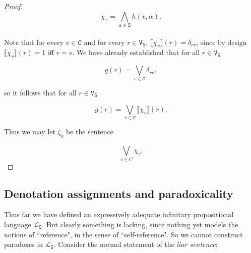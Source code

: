 \documentclass[12pt]{article}
\newtheorem{defn}{Definition}
\theoremstyle{remark}
\newcommand{\fancy}[1]{\mathcal{#1}}
\def\S{\textsf{S}}
\def\V{\texttt{V}}
\def\C{\texttt{C}}
\def\L{\fancy{L}}
\begin{document}
\begin{proof}
\[\chi_v = \bigwedge_{\alpha \in \S} h(v, \alpha).\]\\


Note that for every $v \in \C$ and for every $r \in \V_{\S}$,  $\llbracket \chi_v\rrbracket(r) = \delta_{rv}$, since by design $\llbracket \chi_v\rrbracket(r)  = 1$ iff $r = v$. We have already established that for all $r \in \V_{\S}$

\[g(r) = \bigvee_{v \in \C} \delta_{rv},\]

so it follows that for all $r \in \V_{\S}$

\[g(r) = \bigvee_{v \in \C} \llbracket \chi_v\rrbracket(r).\]

Thus we may let $\zeta_g$ be the sentence 

\[\bigvee_{v \in C} \chi_v.\]
\end{proof}

%
\begin{comment}
\begin{defn}
For $\gamma \in \S^+$ we define its \emph{normal form} $\zeta_{\gamma}$ as $\zeta_{\llbracket\gamma\rrbracket}$.
\end{defn}

In our proofs, we will often encounter sentences like $\phi \wedge \neg \phi$ which always have the same semantic value.  

\begin{defn}
A sentence $\gamma \in \S^+$ is \emph{constant} if $\zeta_{\gamma} \in \{\top, \bot\}$.  Note that if $\gamma$ is a constant sentence, then there is a $c(\gamma) \in \{0, 1\}$ such that $\gamma(v) = c(\gamma)$ for every truth-value assignment $v$ -- we call $c(\gamma)$ the \emph{value} of the contant sentence $\gamma$.  
\end{defn}

This propositional language lacks a truth (or falsity) predicate but this leaves nothing wanting in terms of characterizing the problematic reference structures.
\end{comment}
%

\subsection{Denotation assignments and paradoxicality} 

Thus far we have defined an expressively adequate infinitary propositional language $\L_\S$. But clearly something is lacking, since nothing yet models the notions of ``reference", in the sense of ``self-reference". So we cannot construct paradoxes in $\L_\S$. Consider the normal statement of the  \textit{liar sentence}:
\end{document}
